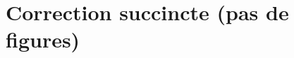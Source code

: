\begin{comment}
\begin{exo}[Si distanciel, enlever les questions de cours et mettre ceci (ressemble bcp à celui de l'année dernière]
Résoudre sur $\C$ l'équation
\[ |z|=|2z+3|\]
\emph{(Indication : l'ensemble des solutions est un cercle du plan complexe. On donnera dans la conclusion le centre et le rayon de ce cercle.)}

\begin{sol}
Soit $z\in \C$. Notons $x=\Re z$ et $y=\Im z$. Alors
\begin{align*}
|z|=|2z+3| &\iff |z|^2=|2z+3|^2\\
&\iff x^2+y^2 = (2x+3)^2+4y^2\\
&\iff x^2+y^2=4x^2+12x+9+4y^2\\
&\iff x^2+4x+3+y^2=0\\
&\iff (x+2)^2+y^2=1\\
&\iff |z+2|^2=1.
\end{align*} 
L'ensemble des solutions est le cercle dont le centre est d'affixe $-2$, et de rayon $1$.
\end{sol}

\end{exo}
\end{comment}







\newpage

\section{Correction  succincte (pas de figures)}




